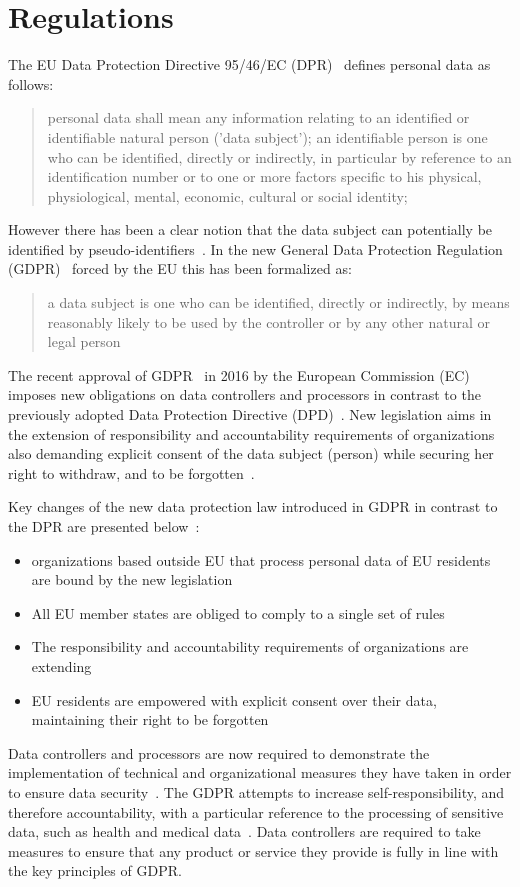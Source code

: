 \section{Regulations}\label{problem:regulations}

The EU Data Protection Directive 95/46/EC (DPR)~\cite{eu-46ec-1995} defines personal data as follows:
\blockquote{
personal data shall mean any information relating to an identified or identifiable natural person ('data subject'); an identifiable person is one who can be identified, directly or indirectly, in particular by reference to an identification number or to one or more factors specific to his physical, physiological, mental, economic, cultural or social identity;
}
However there has been a clear notion that the data subject can potentially be identified by pseudo-identifiers~\cite{pii}.
In the new General Data Protection Regulation (GDPR)~\cite{gdpr} forced by the EU this has been formalized as:
\blockquote{
a data subject is one who can be identified, directly or indirectly, by means reasonably likely to be used by the controller or by any other natural or legal person
}

The recent approval of GDPR~\cite{gdpr} in 2016 by the European Commission (EC)
imposes new obligations on data controllers and processors in contrast to the previously adopted Data Protection Directive (DPD)~\cite{eu-46ec-1995}.
New legislation aims in the extension of responsibility and accountability requirements of organizations also demanding explicit
consent of the data subject (person) while securing her right to withdraw, and to be forgotten~\cite{DBLP:journals/corr/NeisseSF17}.

Key changes of the new data protection law introduced in GDPR in contrast to the DPR are presented below~\cite{DBLP:journals/corr/NeisseSF17}:
\begin{itemize}
    \item organizations based outside EU that process personal data of EU residents are bound by the new legislation
    \item All EU member states are obliged to comply to a single set of rules
    \item The responsibility and accountability requirements of organizations are extending
    \item EU residents are empowered with explicit consent over their data, maintaining their right to be forgotten
\end{itemize}

Data controllers and processors are now required to demonstrate the implementation of technical and organizational measures they have taken in order to ensure data security~\cite{mhmd}. The GDPR attempts to increase self-responsibility, and therefore accountability, with a particular reference to the processing of sensitive data, such as health and medical data~\cite{mhmd}. Data controllers are required to take measures to ensure that any product or service they provide is fully in line with the key principles of GDPR.

